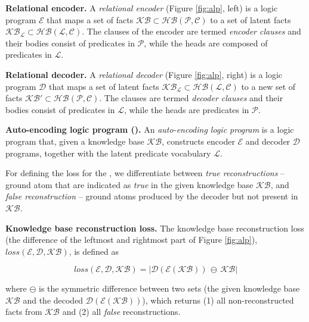 \begin{definition}
\textbf{Relational encoder.}
A \textit{relational encoder} (Figure \ref{fig:alp}, left) is a logic program $\mathcal{E}$ %
that maps a set of facts $\mathcal{KB} \subset \mathcal{HB(P,C)}$ to a set of latent facts $\mathcal{KB}_{\mathcal{L}} \subset \mathcal{HB(L,C)}$.
The clauses of the encoder are termed \textit{encoder clauses} and their bodies consist of predicates in $\mathcal{P}$, while the heads are composed of predicates in $\mathcal{L}$.
\end{definition}


\begin{definition}
\textbf{Relational decoder.}
A \textit{relational decoder} (Figure \ref{fig:alp}, right) is a logic program $\mathcal{D}$ %
that maps a set of latent facts $\mathcal{KB}_{\mathcal{L}} \subset \mathcal{HB(L,C)}$  to a new set of facts $\mathcal{KB}' \subset \mathcal{HB(P,C)}$.
The clauses are termed \textit{decoder clauses} and their bodies consist of predicates in $\mathcal{L}$, while the heads are predicates in $\mathcal{P}$.
\end{definition}



\begin{definition}
\textbf{Auto-encoding logic program (\alp{}).}
An \textit{auto-encoding logic program} is a logic program that, given a knowledge base $\mathcal{KB}$, constructs encoder $\mathcal{E}$ and decoder $\mathcal{D}$ programs, together with the latent predicate vocabulary $\mathcal{L}$.
\end{definition}


For defining the loss for the , we differentiate between \textit{true reconstructions} -- ground atom that are indicated as \textit{true} in the given knowledge base $\mathcal{KB}$, and \textit{false reconstruction} -- ground atoms produced by the decoder but not present in $\mathcal{KB}$.

\begin{definition}
\textbf{Knowledge base reconstruction loss.}
The knowledge base reconstruction loss (the difference of the leftmost and rightmost part of Figure \ref{fig:alp}), $loss(\mathcal{E}, \mathcal{D}, \mathcal{KB})$, is defined as

\begin{equation}
    loss(\mathcal{E},\mathcal{D},\mathcal{KB}) = | \mathcal{D}(\mathcal{E}(\mathcal{KB})) \, \ominus \, \mathcal{KB} |
    \label{eq:reconstruction}
\end{equation}


where $\ominus$ is the symmetric difference between two sets (the given knowledge base $\mathcal{KB}$ and the decoded $\mathcal{D}(\mathcal{E}(\mathcal{KB}))$), which returns (1) all non-reconstructed facts from $\mathcal{KB}$ and (2)  all \textit{false} reconstructions.
\end{definition}



